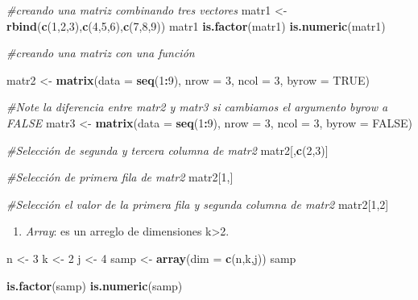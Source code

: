 \documentclass[
]{article}
\newenvironment{Shaded}{\begin{snugshade}}{\end{snugshade}}
\newcommand{\CommentTok}[1]{\textcolor[rgb]{0.56,0.35,0.01}{\textit{#1}}}
\newcommand{\DataTypeTok}[1]{\textcolor[rgb]{0.13,0.29,0.53}{#1}}
\newcommand{\DecValTok}[1]{\textcolor[rgb]{0.00,0.00,0.81}{#1}}
\newcommand{\KeywordTok}[1]{\textcolor[rgb]{0.13,0.29,0.53}{\textbf{#1}}}
\newcommand{\NormalTok}[1]{#1}
\newcommand{\OperatorTok}[1]{\textcolor[rgb]{0.81,0.36,0.00}{\textbf{#1}}}
\newcommand{\OtherTok}[1]{\textcolor[rgb]{0.56,0.35,0.01}{#1}}
\newcommand{\StringTok}[1]{\textcolor[rgb]{0.31,0.60,0.02}{#1}}
\providecommand{\tightlist}{%
  \setlength{\itemsep}{0pt}\setlength{\parskip}{0pt}}
\begin{document}
\begin{Shaded}
\begin{Highlighting}[]
\CommentTok{#creando una matriz combinando tres vectores}
\NormalTok{matr1 <-}\StringTok{ }\KeywordTok{rbind}\NormalTok{(}\KeywordTok{c}\NormalTok{(}\DecValTok{1}\NormalTok{,}\DecValTok{2}\NormalTok{,}\DecValTok{3}\NormalTok{),}\KeywordTok{c}\NormalTok{(}\DecValTok{4}\NormalTok{,}\DecValTok{5}\NormalTok{,}\DecValTok{6}\NormalTok{),}\KeywordTok{c}\NormalTok{(}\DecValTok{7}\NormalTok{,}\DecValTok{8}\NormalTok{,}\DecValTok{9}\NormalTok{))}
\NormalTok{matr1}
\KeywordTok{is.factor}\NormalTok{(matr1)}
\KeywordTok{is.numeric}\NormalTok{(matr1)}

\CommentTok{#creando una matriz con una función}

\NormalTok{matr2 <-}\StringTok{ }\KeywordTok{matrix}\NormalTok{(}\DataTypeTok{data =} \KeywordTok{seq}\NormalTok{(}\DecValTok{1}\OperatorTok{:}\DecValTok{9}\NormalTok{), }\DataTypeTok{nrow =} \DecValTok{3}\NormalTok{, }\DataTypeTok{ncol =} \DecValTok{3}\NormalTok{, }\DataTypeTok{byrow =} \OtherTok{TRUE}\NormalTok{)}

\CommentTok{#Note la diferencia entre matr2 y matr3 si cambiamos el argumento byrow a FALSE}
\NormalTok{matr3 <-}\StringTok{ }\KeywordTok{matrix}\NormalTok{(}\DataTypeTok{data =} \KeywordTok{seq}\NormalTok{(}\DecValTok{1}\OperatorTok{:}\DecValTok{9}\NormalTok{), }\DataTypeTok{nrow =} \DecValTok{3}\NormalTok{, }\DataTypeTok{ncol =} \DecValTok{3}\NormalTok{, }\DataTypeTok{byrow =} \OtherTok{FALSE}\NormalTok{)}

\CommentTok{#Selección de segunda y tercera columna de matr2}
\NormalTok{matr2[,}\KeywordTok{c}\NormalTok{(}\DecValTok{2}\NormalTok{,}\DecValTok{3}\NormalTok{)]}

\CommentTok{#Selección de primera fila de matr2}
\NormalTok{matr2[}\DecValTok{1}\NormalTok{,]}

\CommentTok{#Selección el valor de la primera fila y segunda columna de matr2}
\NormalTok{matr2[}\DecValTok{1}\NormalTok{,}\DecValTok{2}\NormalTok{]}
\end{Highlighting}
\end{Shaded}

\begin{enumerate}
\def\labelenumi{\Alph{enumi})}
\setcounter{enumi}{2}
\tightlist
\item
  \emph{Array}: es un arreglo de dimensiones k\textgreater2.
\end{enumerate}

\begin{Shaded}
\begin{Highlighting}[]
\NormalTok{n <-}\StringTok{ }\DecValTok{3}
\NormalTok{k <-}\StringTok{ }\DecValTok{2}
\NormalTok{j <-}\StringTok{ }\DecValTok{4}
\NormalTok{samp <-}\StringTok{ }\KeywordTok{array}\NormalTok{(}\DataTypeTok{dim =} \KeywordTok{c}\NormalTok{(n,k,j))}
\NormalTok{samp}

\KeywordTok{is.factor}\NormalTok{(samp)}
\KeywordTok{is.numeric}\NormalTok{(samp)}
\end{Highlighting}
\end{Shaded}
\end{document}
